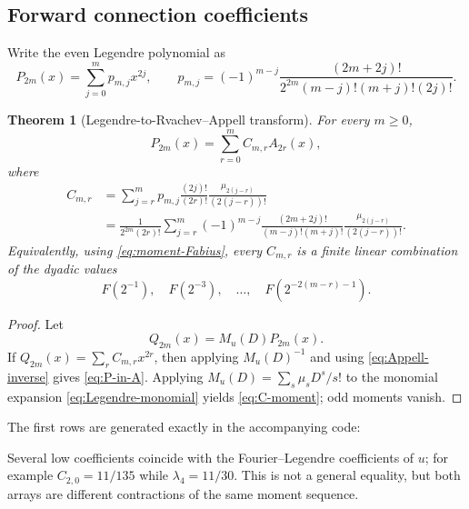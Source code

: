 \documentclass[11pt,oneside]{article}
\newtheorem{theorem}{Theorem}[section]
\theoremstyle{definition}
\theoremstyle{remark}
\begin{document}
\subsection{Forward connection coefficients}
Write the even Legendre polynomial as
\begin{equation}
 P_{2m}(x)=\sum_{j=0}^{m}p_{m,j}x^{2j},
 \qquad
 p_{m,j}=(-1)^{m-j}
 \frac{(2m+2j)!}{2^{2m}(m-j)!(m+j)!(2j)!}.
 \label{eq:Legendre-monomial}
\end{equation}

\begin{theorem}[Legendre-to-Rvachev--Appell transform]
\label{thm:C-transform}
For every $m\ge0$,
\begin{equation}
 \boxed{P_{2m}(x)=\sum_{r=0}^{m}C_{m,r}A_{2r}(x),}
 \label{eq:P-in-A}
\end{equation}
where
\begin{align}
 C_{m,r}
 &=\sum_{j=r}^{m}p_{m,j}
 \frac{(2j)!}{(2r)!}
 \frac{\mu_{2(j-r)}}{(2(j-r))!}
 \label{eq:C-moment}\\
 &=\frac1{2^{2m}(2r)!}
 \sum_{j=r}^{m}(-1)^{m-j}
 \frac{(2m+2j)!}{(m-j)!(m+j)!}
 \frac{\mu_{2(j-r)}}{(2(j-r))!}.
 \label{eq:C-explicit}
\end{align}
Equivalently, using \eqref{eq:moment-Fabius}, every $C_{m,r}$ is a finite
linear combination of the dyadic values
\[
 F(2^{-1}),\quad F(2^{-3}),\quad\ldots,\quad F(2^{-2(m-r)-1}).
\]
\end{theorem}

\begin{proof}
Let
\begin{equation}
 Q_{2m}(x)=M_u(D)P_{2m}(x).
 \label{eq:Q-def}
\end{equation}
If $Q_{2m}(x)=\sum_rC_{m,r}x^{2r}$, then applying $M_u(D)^{-1}$ and using
\eqref{eq:Appell-inverse} gives \eqref{eq:P-in-A}.  Applying
$M_u(D)=\sum_s\mu_sD^s/s!$ to the monomial expansion
\eqref{eq:Legendre-monomial} yields \eqref{eq:C-moment}; odd moments vanish.
\end{proof}

The first rows are generated exactly in the accompanying code:
\begin{center}
\begin{minipage}{0.98\textwidth}
\small

\end{minipage}
\end{center}
Several low coefficients coincide with the Fourier--Legendre coefficients of
$u$; for example $C_{2,0}=11/135$ while $\lambda_4=11/30$.  This is not a
general equality, but both arrays are different contractions of the same
moment sequence.
\end{document}
